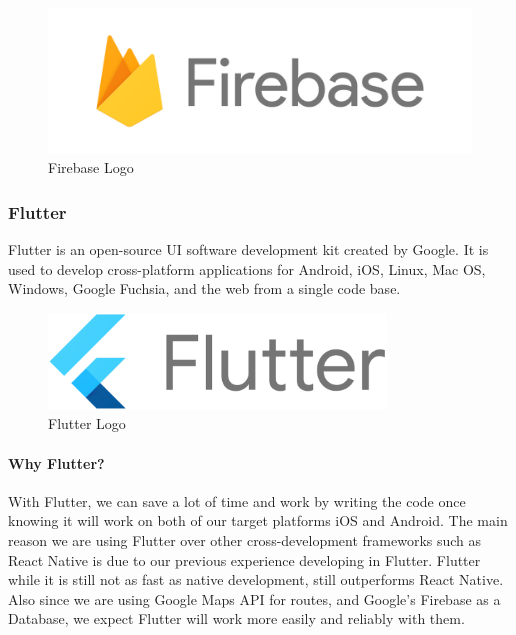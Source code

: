 \documentclass[a4paper, 12pt]{report} %
\begin{document}
                \begin{figure}[h]
                    \centering
                    \includegraphics[width=1\textwidth]{Firebase_Logo.png}
                    \caption{Firebase Logo \cite{firebase_logo}}
                    \label{fig:Firebase Logo}
                \end{figure}
            \pagebreak
            \subsubsection{Flutter}
                Flutter is an open-source UI software development kit created by Google. It is used to develop cross-platform applications for Android, iOS, Linux, Mac OS, Windows, Google Fuchsia, and the web from a single code base. \cite{flutter_wiki}
                \begin{figure}[h] %
                    \centering
                    \includegraphics[width=0.8\textwidth]{Google-flutter-logo.png}
                    \caption{Flutter Logo \cite{flutter_logo}}
                    \label{fig: Flutter Logo}
                \end{figure}
                \paragraph{Why Flutter?}
                With Flutter, we can save a lot of time and work by writing the code once knowing it will work on both of our target platforms iOS and Android. The main reason we are using Flutter over other cross-development frameworks such as React Native is due to our previous experience developing in Flutter. Flutter while it is still not as fast as native development, still outperforms React Native. Also since we are using Google Maps API for routes, and Google's Firebase as a Database, we expect Flutter will work more easily and reliably with them. 
            \pagebreak
\end{document}
